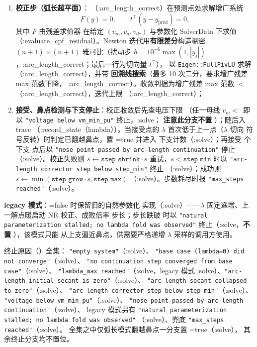 \begin{enumerate}
        （:solve）；
  \item \textbf{校正步（弧长超平面）}：
        （:arc\_length\_correct）在预测点处求解增广系统
        \[
        F(y)=0,\qquad t^{\top}(y-y_{\mathrm{pred}})=0,
        \]
        其中 $F$ 由残差求值器 
        在给定 $(v_m,v_a,v_{dc})$ 与参数化 SolverData 下求值
        （:evaluate\_cpf\_residual）。Newton 迭代用\textbf{有限差分}构造稠密
        $(n+1)\times(n+1)$ 雅可比（扰动步
        $h=10^{-6}\max(1,|y_j|)$，:arc\_length\_correct；最后一行为切向量 $t^{\top}$），
        以 \texttt{Eigen::FullPivLU} 求解（:arc\_length\_correct），并带
        \textbf{回溯线搜索}（最多 10 次二分，要求增广残差 max 范数下降，
        :arc\_length\_correct）。收敛判据为增广残差 max 范数 $<\,$
        （:arc\_length\_correct），迭代上限 （:arc\_length\_correct）；
  \item \textbf{接受、鼻点检测与下支停止}：校正收敛后先查电压下限
        （任一母线 $v_m<\,$ 即以
        \texttt{"voltage below vm\_min\_pu"} 终止，:solve；
        \textbf{注意此分支不置 }）；随后入 trace
        （:record\_state（lambda））。当接受点的 $\lambda$ 首次低于上一点（$\lambda$ 切向
        符号反转）时判定已翻越鼻点，置 =true 并进入
        下支计数（:solve）；再接受  个下支
        点后以
        \texttt{"nose point passed by arc-length continuation"} 停止
        （:solve）。校正失败则 $s\leftarrow\texttt{step\_shrink}\cdot s$
        重试，$s<\texttt{step\_min}$ 时以
        \texttt{"arc-length corrector step below step\_min"} 终止
        （:solve）；成功则
        $s\leftarrow\min(\texttt{step\_grow}\cdot s,\texttt{step\_max})$
        （:solve）。步数耗尽时报 \texttt{"max\_steps reached"}（:solve）。
\end{enumerate}
\textbf{legacy 模式}：=false 时保留旧的自然参数化
实现（:solve）——$\lambda$ 固定递增、上一解点暖启动 NR 校正、成败倍率
步长；步长跌破  时以
\texttt{"natural parameterization stalled; no lambda fold was observed"}
终止（:solve，\textbf{不置} ），该模式只能
从上支逼近鼻点，供需要严格递增 $\lambda$ 采样的调用方使用。

终止原因（）全集：
\texttt{"empty system"}（:solve）、
\texttt{"base case (lambda=0) did not converge"}（:solve）、
\texttt{"no continuation step converged from base case"}（:solve）、
\texttt{"lambda\_max reached"}（:solve，legacy 模式
:solve）、\texttt{"arc-length initial secant is zero"}（:solve）、
\texttt{"arc-length secant collapsed to zero"}（:solve）、
\texttt{"arc-length corrector step below step\_min"}（:solve）、
\texttt{"voltage below vm\_min\_pu"}（:solve）、
\texttt{"nose point passed by arc-length continuation"}（:solve）、
legacy 模式另有
\texttt{"natural parameterization stalled; no lambda fold was observed"}
（:solve）、兜底 \texttt{"max\_steps reached"}（:solve）。
全集之中仅弧长模式翻越鼻点一分支置 =true（:solve），
其余终止分支均不置位。

